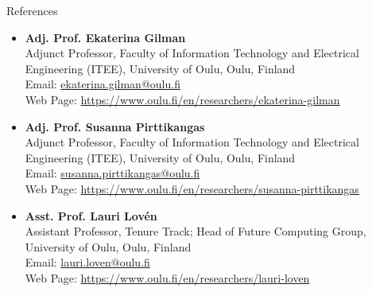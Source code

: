 \documentclass{resume}
\begin{document}

\begin{rSection}{References}
\vspace{+.1cm}

\begin{itemize}

    \item {\bf Adj. Prof. Ekaterina Gilman} \\
    Adjunct Professor, Faculty of Information Technology and Electrical Engineering (ITEE), University of Oulu, Oulu, Finland \\
    Email: \href{mailto:ekaterina.gilman@oulu.fi}{ekaterina.gilman@oulu.fi} \\
    Web Page: \href{https://www.oulu.fi/en/researchers/ekaterina-gilman}{https://www.oulu.fi/en/researchers/ekaterina-gilman}

    \item {\bf Adj. Prof. Susanna Pirttikangas} \\
    Adjunct Professor, Faculty of Information Technology and Electrical Engineering (ITEE), University of Oulu, Oulu, Finland \\
    Email: \href{mailto:susanna.pirttikangas@oulu.fi}{susanna.pirttikangas@oulu.fi} \\
    Web Page: \href{https://www.oulu.fi/en/researchers/susanna-pirttikangas}{https://www.oulu.fi/en/researchers/susanna-pirttikangas}

    \item {\bf Asst. Prof. Lauri Lov\'en} \\
    Assistant Professor, Tenure Track; Head of Future Computing Group, University of Oulu, Oulu, Finland \\
    Email: \href{mailto:lauri.loven@oulu.fi}{lauri.loven@oulu.fi} \\
    Web Page: \href{https://www.oulu.fi/en/researchers/lauri-loven}{https://www.oulu.fi/en/researchers/lauri-loven}

\end{itemize}

\end{rSection}
\end{document}
